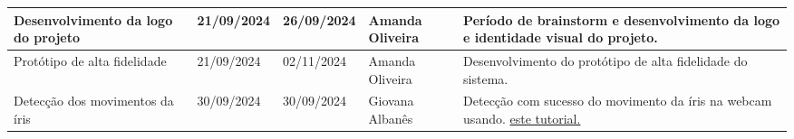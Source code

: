 \documentclass[
landscape,
  a4paper,%
  12pt,%
  english,%
  brazilian,%
]{article}
\begin{document}
\begin{table}[]
\begin{tabular}{|l|l|l|p{5cm}|p{8cm}|}
Desenvolvimento da logo do projeto    & 21/09/2024      & 26/09/2024      & Amanda Oliveira             & Período de brainstorm e desenvolvimento da logo e identidade visual do projeto. \\ \hline
Protótipo de alta fidelidade          & 21/09/2024      & 02/11/2024      & Amanda Oliveira             & Desenvolvimento do protótipo de alta fidelidade do sistema. \\ \hline
Detecção dos movimentos da íris       & 30/09/2024      & 30/09/2024      & Giovana Albanês             & Detecção com sucesso do movimento da íris na webcam usando. \href{https://www.youtube.com/watch?v=WCb4OwmtEFU}{este tutorial.} \\ \hline
\end{tabular}
\end{table}

\break
\end{document}
